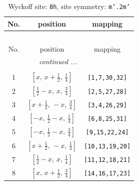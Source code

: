 \documentclass[fleqn,8pt]{jsarticle}
\begin{document}
\begin{longtable}{ccc}
\caption{Wyckoff site: {\tt 8h}, site symmetry: {\tt m'.2m'}}
 \\
 \hline \hline
No. & position & mapping \\ \hline \endfirsthead

\multicolumn{2}{l}{\tablename\ \thetable{}} \\
 \hline \hline
No. & position & mapping \\ \hline \endhead

 \hline \hline
\multicolumn{2}{r}{\footnotesize\it continued ...} \\ \endfoot

 \hline \hline
\multicolumn{2}{r}{} \\ \endlastfoot

1 & $\left[ x,\, x + \frac{1}{2},\, \frac{1}{4} \right]$ & {\tt [1,7,30,32]} \\ \hline
2 & $\left[ \frac{1}{2} - x,\, x,\, \frac{3}{4} \right]$ & {\tt [2,5,27,28]} \\ \hline
3 & $\left[ x + \frac{1}{2},\, - x,\, \frac{3}{4} \right]$ & {\tt [3,4,26,29]} \\ \hline
4 & $\left[ - x,\, \frac{1}{2} - x,\, \frac{1}{4} \right]$ & {\tt [6,8,25,31]} \\ \hline
5 & $\left[ - x,\, \frac{1}{2} - x,\, \frac{3}{4} \right]$ & {\tt [9,15,22,24]} \\ \hline
6 & $\left[ x + \frac{1}{2},\, - x,\, \frac{1}{4} \right]$ & {\tt [10,13,19,20]} \\ \hline
7 & $\left[ \frac{1}{2} - x,\, x,\, \frac{1}{4} \right]$ & {\tt [11,12,18,21]} \\ \hline
8 & $\left[ x,\, x + \frac{1}{2},\, \frac{3}{4} \right]$ & {\tt [14,16,17,23]} \\
\end{longtable}
\renewcommand{\arraystretch}{1.2}
\end{document}
